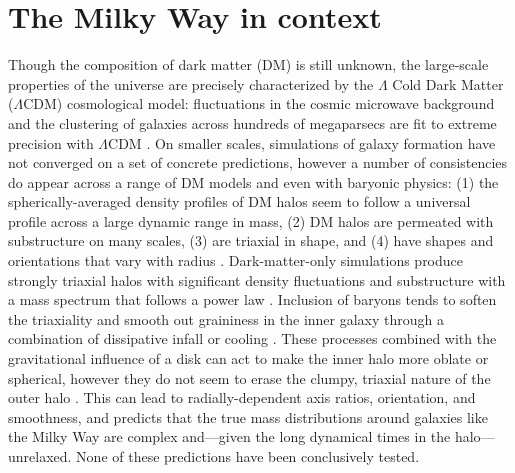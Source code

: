 

\section{The Milky Way in context}\label{sec:milkyway-context}

Though the composition of dark matter (DM) is still unknown, the large-scale properties of the universe are precisely characterized by the $\Lambda$ Cold Dark Matter ($\Lambda$CDM) cosmological model: fluctuations in the cosmic microwave background and the clustering of galaxies across hundreds of megaparsecs are fit to extreme precision with $\Lambda$CDM \citep{planck15, sanchez12}. On smaller scales, simulations of galaxy formation have not converged on a set of concrete predictions, however a number of consistencies do appear across a range of DM models and even with baryonic physics: (1) the spherically-averaged density profiles of DM halos seem to follow a universal profile across a large dynamic range in mass, (2) DM halos are permeated with substructure on many scales, (3) are triaxial in shape, and (4) have shapes and orientations that vary with radius \citep{dubinski91, navarro96, jing02, kuhlen07, veraciro11}. Dark-matter-only simulations produce strongly triaxial halos \citep{jing02} with significant density fluctuations and substructure with a mass spectrum that follows a power law \citep{zemp09}. Inclusion of baryons tends to soften the triaxiality and smooth out graininess in the inner galaxy through a combination of dissipative infall \citep{dubinski94} or cooling \citep{bryan13}. These processes combined with the gravitational influence of a disk can act to make the inner halo more oblate or spherical, however they do not seem to erase the clumpy, triaxial nature of the outer halo \citep[e.g.,][]{pontzen12, zhu15}. This can lead to radially-dependent axis ratios, orientation, and smoothness, and predicts that the true mass distributions around galaxies like the Milky Way are complex and---given the long dynamical times in the halo---unrelaxed. None of these predictions have been conclusively tested.

